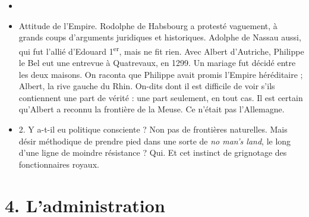 \documentclass[french,twoside]{book} %
\newcommand\chapteropen{} %
\newcommand\chaptercont{} %
\newcommand\chapterclose{} %
\renewcommand\chapteropen{} %
\renewcommand\chaptercont{} %
\renewcommand\chapterclose{} %
\begin{document}
\begin{enumerate}[itemsep=\baselineskip,]
\begin{itemize}[itemsep=0pt,]
\item[] \hspace{-1.5em}{\bfseries Problèmes :}
\item Attitude de l’Empire. Rodolphe de Habsbourg a protesté vaguement, à grands coups d’arguments juridiques et historiques. Adolphe de Nassau aussi, qui fut l’allié d’Edouard 1\textsuperscript{er}, mais ne fit rien. Avec Albert d’Autriche, Philippe le Bel eut une entrevue à Quatrevaux, en 1299. Un mariage fut décidé entre les deux maisons. On raconta que Philippe avait promis l’Empire héréditaire ; Albert, la rive gauche du Rhin. On-dits dont il est difficile de voir s’ils contiennent une part de vérité : une part seulement, en tout cas. Il est certain qu’Albert a reconnu la frontière de la Meuse. Ce n’était pas l’Allemagne.
\item 2. Y a-t-il eu politique consciente ? Non pas de frontières naturelles. Mais désir méthodique de prendre pied dans une sorte de {\itshape no man’s land}, le long d’une ligne de moindre résistance ? Qui. Et cet instinct de grignotage des fonctionnaires royaux.
\end{itemize}


\end{enumerate}\chapterclose


\chapteropen
\chapter[4. L’administration]{\textsc{4. }L’administration}
\label{c04}

\chaptercont
\end{document}
